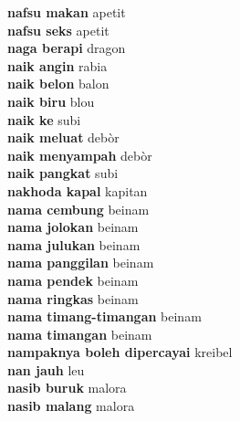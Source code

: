 \textbf{ nafsu makan  } apetit \\
\textbf{ nafsu seks  } apetit \\
\textbf{ naga berapi  } dragon \\
\textbf{ naik angin  } rabia \\
\textbf{ naik belon  } balon \\
\textbf{ naik biru  } blou \\
\textbf{ naik ke  } subi \\
\textbf{ naik meluat  } debòr \\
\textbf{ naik menyampah  } debòr \\
\textbf{ naik pangkat  } subi \\
\textbf{ nakhoda kapal  } kapitan \\
\textbf{ nama cembung  } beinam \\
\textbf{ nama jolokan  } beinam \\
\textbf{ nama julukan  } beinam \\
\textbf{ nama panggilan  } beinam \\
\textbf{ nama pendek  } beinam \\
\textbf{ nama ringkas  } beinam \\
\textbf{ nama timang-timangan  } beinam \\
\textbf{ nama timangan  } beinam \\
\textbf{ nampaknya boleh dipercayai  } kreibel \\
\textbf{ nan jauh  } leu \\
\textbf{ nasib buruk  } malora \\
\textbf{ nasib malang  } malora \\

